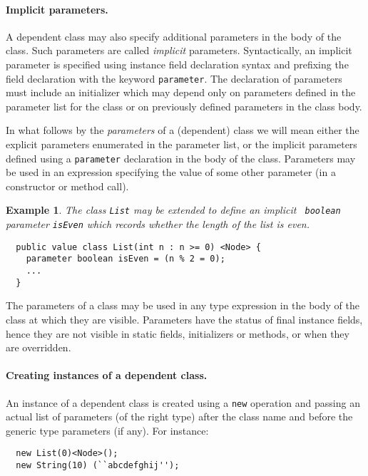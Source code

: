 \documentclass{article}
\newtheorem{example}{Example}[section]
\begin{document}
{}\paragraph{Implicit parameters.}
A dependent class may also specify additional parameters in the body
of the class. Such parameters are called {\em implicit} parameters.
Syntactically, an implicit parameter is specified using instance field
declaration syntax and prefixing the field declaration with the
keyword {\tt parameter}. The declaration of parameters must include an
initializer which may depend only on parameters defined in the
parameter list for the class or on previously defined parameters in
the class body.  

In what follows by the {\em parameters} of a (dependent) class we will
mean either the explicit parameters enumerated in the parameter list,
or the implicit parameters defined using a {\tt parameter} declaration
in the body of the class. Parameters may be used  in an
expression specifying the value of some other parameter (in a
constructor or method call).

\begin{example}
The class {\tt List} may be extended to define an implicit {\tt
boolean} parameter {\tt isEven} which records whether the length of
the list is even.
{\footnotesize
\begin{verbatim}
  public value class List(int n : n >= 0) <Node> {
    parameter boolean isEven = (n % 2 = 0);
    ...
  }  
\end{verbatim}}
\end{example}

The parameters of a class may be used in any type expression in the
body of the class at which they are visible. Parameters have the
status of final instance fields, hence they are not visible in static
fields, initializers or methods, or when they are overridden.

{}\paragraph{Creating instances of a dependent class.}
An instance of a dependent class is created using a {\tt new} operation
and passing an actual list of parameters (of the right type) after the 
class name and before the generic type parameters (if any).  For instance:
{\footnotesize
\begin{verbatim}
  new List(0)<Node>();
  new String(10) (``abcdefghij'');
\end{verbatim}}
\end{document}
